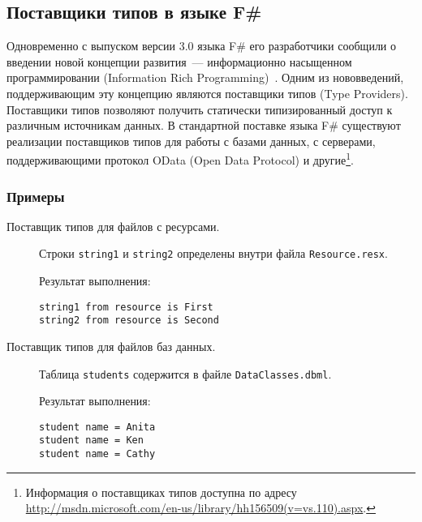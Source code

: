 \subsection{Поставщики типов в языке F\#}\label{f-sharp-type-providers}
Одновременно с выпуском версии 3.0 языка F\# его разработчики сообщили о введении новой концепции развития~--- информационно насыщенном программировании (Information Rich Programming)~\cite{joepamer2011}.
Одним из нововведений, поддерживающим эту концепцию являются поставщики типов (Type Providers).
Поставщики типов позволяют получить статически типизированный доступ к различным источникам данных.
В стандартной поставке языка F\# существуют реализации поставщиков типов для работы с базами данных, с серверами, поддерживающими протокол OData (Open Data Protocol) и другие\footnote{Информация о поставщиках типов доступна по адресу \url{http://msdn.microsoft.com/en-us/library/hh156509(v=vs.110).aspx}.}.

\subsubsection{Примеры}
\begin{description}
\item[Поставщик типов для файлов с ресурсами.] Строки \texttt{string1} и \texttt{string2} определены внутри файла \texttt{Resource.resx}.


Результат выполнения:
\begin{lstlisting}
string1 from resource is First
string2 from resource is Second
\end{lstlisting}

\item[Поставщик типов для файлов баз данных.] Таблица \texttt{students} содержится в файле \texttt{DataClasses.dbml}.


Результат выполнения:
\begin{lstlisting}
student name = Anita
student name = Ken
student name = Cathy
\end{lstlisting}

\end{description}    